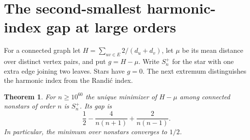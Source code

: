 \documentclass[11pt,a4paper]{article}
\newtheorem{theorem}{Theorem}[section]
\begin{document}
\section{The second-smallest harmonic-index gap at large orders}\label{sec:hgap}
For a connected graph let $H=\sum_{uv\in E}2/(d_u+d_v)$, let $\mu$ be its mean distance over distinct vertex pairs, and put $g=H-\mu$. Write $S_n^+$ for the star with one extra edge joining two leaves. Stars have $g=0$. The next extremum distinguishes the harmonic index from the Randi\'c index.

\begin{theorem}\label{thm:hgap}
For $n\ge10^{60}$ the unique minimizer of $H-\mu$ among connected nonstars of order $n$ is $S_n^+$. Its gap is
\[
 \frac12-\frac4{n(n+1)}+\frac2{n(n-1)}.
\]
In particular, the minimum over nonstars converges to $1/2$.
\end{theorem}
\end{document}
